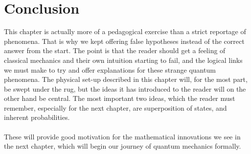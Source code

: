 \section{Conclusion}
This chapter is actually more of a pedagogical exercise than a strict reportage of phenomena. That is why we kept offering false hypotheses instead of the correct answer from the start. The point is that the reader should get a feeling of classical mechanics and their own intuition starting to fail, and the logical links we must make to try and offer explanations for these strange quantum phenomena. The physical set-up described in this chapter will, for the most part, be swept under the rug, but the ideas it has introduced to the reader will on the other hand be central. The most important two ideas, which the reader must remember, especially for the next chapter, are superposition of states, and inherent probabilities.
\\\\
These will provide good motivation for the mathematical innovations we see in the next chapter, which will begin our journey of quantum mechanics formally.